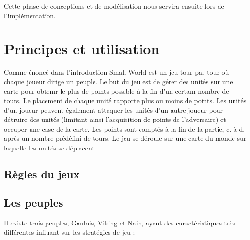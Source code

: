 \documentclass[a4paper]{article}%
\begin{document}
\medskip

Cette phase de conceptions et de modélisation nous servira ensuite lors de l'implémentation.


\section{Principes et utilisation}

Comme énoncé dans l'introduction Small World est un jeu tour-par-tour où chaque joueur dirige un peuple. Le but du jeu est de gérer des unités sur une carte pour obtenir le plus de points possible à la fin d’un certain nombre de tours. Le placement de chaque unité rapporte plus ou moins de points. Les unités d’un joueur peuvent également attaquer les unités d’un autre joueur pour détruire des unités (limitant ainsi l’acquisition de points de l’adversaire) et occuper une case de la carte. Les points sont comptés à la fin de la partie, c.-à-d. après un nombre prédéfini de tours. Le jeu se déroule sur une carte du monde sur laquelle les unités se déplacent.

\subsection{Règles du jeux}
\subsection{Les peuples}
Il existe trois peuples, Gaulois, Viking et Nain, ayant des caractéristiques très différentes influant sur les stratégies de jeu :
\end{document}
